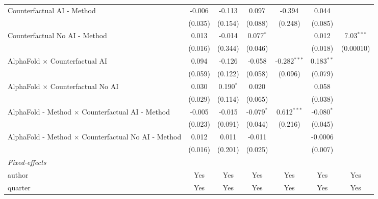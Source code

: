 \begin{tabular}{lcccccc}
   Counterfactual AI - Method                                 & -0.006  & -0.113      & 0.097        & -0.394         & 0.044        &   \\   
                                                              & (0.035) & (0.154)     & (0.088)      & (0.248)        & (0.085)      &   \\   
   Counterfactual No AI - Method                              & 0.013   & -0.014      & 0.077$^{*}$  &                & 0.012        & 7.03$^{***}$\\   
                                                              & (0.016) & (0.344)     & (0.046)      &                & (0.018)      & (0.00010)\\   
   AlphaFold $\times$ Counterfactual AI                       & 0.094   & -0.126      & -0.058       & -0.282$^{***}$ & 0.183$^{**}$ &   \\   
                                                              & (0.059) & (0.122)     & (0.058)      & (0.096)        & (0.079)      &   \\   
   AlphaFold $\times$ Counterfactual No AI                    & 0.030   & 0.190$^{*}$ & 0.020        &                & 0.058        &   \\   
                                                              & (0.029) & (0.114)     & (0.065)      &                & (0.038)      &   \\   
   AlphaFold - Method $\times$ Counterfactual AI - Method     & -0.005  & -0.015      & -0.079$^{*}$ & 0.612$^{***}$  & -0.080$^{*}$ &   \\   
                                                              & (0.023) & (0.091)     & (0.044)      & (0.216)        & (0.045)      &   \\   
   AlphaFold - Method $\times$ Counterfactual No AI - Method  & 0.012   & 0.011       & -0.011       &                & -0.0006      &   \\   
                                                              & (0.016) & (0.201)     & (0.025)      &                & (0.007)      &   \\   
   \midrule
   \emph{Fixed-effects}\\
   author                                                     & Yes     & Yes         & Yes          & Yes            & Yes          & Yes\\  
   quarter                                                    & Yes     & Yes         & Yes          & Yes            & Yes          & Yes\\  

\end{tabular}
